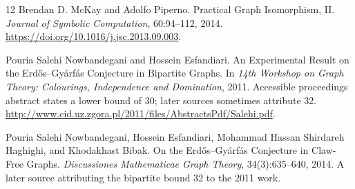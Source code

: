 \documentclass[11pt]{article}
\theoremstyle{definition}
\begin{document}
\begin{thebibliography}{12}
Brendan D. McKay and Adolfo Piperno.
\newblock Practical Graph Isomorphism, II.
\newblock \emph{Journal of Symbolic Computation}, 60:94--112, 2014.
\newblock \url{https://doi.org/10.1016/j.jsc.2013.09.003}.

Pouria Salehi Nowbandegani and Hossein Esfandiari.
\newblock An Experimental Result on the Erd\H{o}s--Gy\'arf\'as Conjecture in
Bipartite Graphs.
\newblock In \emph{14th Workshop on Graph Theory: Colourings, Independence
and Domination}, 2011. Accessible proceedings abstract states a lower bound
of 30; later sources sometimes attribute 32.
\newblock \url{http://www.cid.uz.zgora.pl/2011/files/AbstractsPdf/Salehi.pdf}.

Pouria Salehi Nowbandegani, Hossein Esfandiari, Mohammad Hassan Shirdareh
Haghighi, and Khodakhast Bibak.
\newblock On the Erd\H{o}s--Gy\'arf\'as Conjecture in Claw-Free Graphs.
\newblock \emph{Discussiones Mathematicae Graph Theory}, 34(3):635--640,
2014. A later source attributing the bipartite bound 32 to the 2011 work.

\end{thebibliography}
\end{document}
